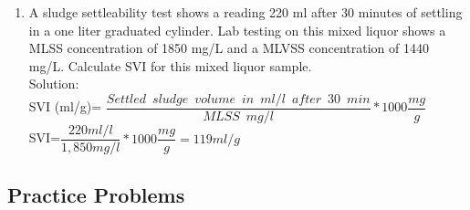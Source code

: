 \documentclass{article}
\begin{document}
\begin{enumerate}
\item A sludge settleability test shows a reading 220 ml after 30 minutes of settling in a one liter graduated cylinder. Lab testing on this mixed liquor shows a MLSS concentration of 1850 mg/L and a MLVSS concentration of 1440 mg/L. Calculate SVI for this mixed liquor sample.\\

Solution:\\
SVI (ml/g)= $\dfrac{Settled \enspace sludge \enspace volume \enspace in \enspace ml/l \enspace after \enspace 30 \enspace min}{MLSS \enspace mg/l}*1000 \dfrac{mg}{g}$\\
\vspace{0.5cm}
SVI=$\dfrac{220ml/l}{1,850mg/l}*1000\dfrac{mg}{g}=\boxed{119ml/g}$


\end{enumerate}

\subsection{Practice Problems} 
\end{document}
